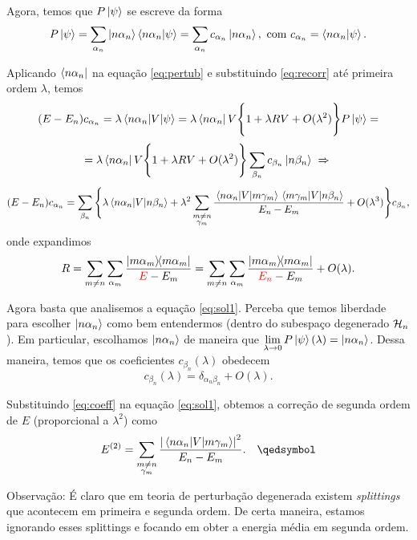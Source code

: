 \documentclass[a4paper,12pt]{article}
\begin{document}
Agora, temos que $P \ket{\psi}$ se escreve da forma
$$
P \ket{\psi} = \sum_{\alpha_n} \ket{n \alpha_n} \braket{n\alpha_n}{\psi} =
\sum_{\alpha_n} c_{\alpha_n} \ket{n \alpha_n}, \text{ com } c_{\alpha_n} = \braket{n\alpha_n}{\psi}.
$$

Aplicando $\bra{n \alpha_n}$ na equação \ref{eq:pertub} e substituindo \ref{eq:recorr} até primeira ordem $\lambda$, temos
$$
(E - E_n) c_{\alpha_n} = \lambda \mel{n \alpha_n}{V}{\psi} =
\lambda \bra{n \alpha_n} V \Bigg\{ 1 + \lambda R V + O(\lambda^2) \Bigg\} P \ket{\psi} =
$$
$$
=
\lambda \bra{n \alpha_n} V \Bigg\{ 1 + \lambda R V + O(\lambda^2) \Bigg\} \sum_{\beta_n} c_{\beta_n} \ket{n \beta_n} \; \Rightarrow \;
$$
\begin{equation} \label{eq:sol1}
(E - E_n) c_{\alpha_n} =
\sum_{\beta_n} \Bigg\{
\lambda \mel{n \alpha_n}{V}{n \beta_n} + \lambda^2 \sum_{\substack{m \neq n \\ \gamma_m}}
\frac{\mel{n \alpha_n}{V}{m \gamma_m} \mel{m \gamma_m}{V}{n \beta_n}}{E_n - E_m} + O(\lambda^3)
\Bigg\} c_{\beta_n},
\end{equation}
onde expandimos
$$
R = \sum_{m \neq n} \sum_{\alpha_m} \frac{\ketbra{m \alpha_m}}{\textcolor{red}{E} - E_m}
= \sum_{m \neq n} \sum_{\alpha_m} \frac{\ketbra{m \alpha_m}}{\textcolor{red}{E_n} - E_m} + O(\lambda).
$$

Agora basta que analisemos a equação \ref{eq:sol1}. Perceba que temos liberdade para escolher $\ket{n \alpha_n}$ como bem entendermos (dentro do subespaço degenerado $\mathcal{H}_n$). Em particular, escolhamos $\ket{n \alpha_n}$ de maneira que $\displaystyle{\lim_{\lambda \to 0} P \ket{\psi} (\lambda) = \ket{n \alpha_n}}$. Dessa maneira, temos que os coeficientes $c_{\beta_n}(\lambda)$ obedecem
\begin{equation} \label{eq:coeff}
c_{\beta_n}(\lambda) = \delta_{\alpha_n \beta_n} + O(\lambda).
\end{equation}

Substituindo \ref{eq:coeff} na equação \ref{eq:sol1}, obtemos a correção de segunda ordem de $E$ (proporcional a $\lambda^2$) como
$$
E^{(2)} = \sum_{\substack{m \neq n \\ \gamma_m}} \frac{\abs{\mel{n \alpha_n}{V}{m \gamma_m}}^2}{E_n - E_m}.
\quad \qedsymbol
$$

Observação: É claro que em teoria de perturbação degenerada existem \textit{splittings} que acontecem em primeira e segunda ordem. De certa maneira, estamos ignorando esses splittings e focando em obter a energia média em segunda ordem.
\end{document}
